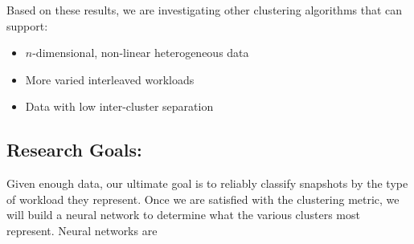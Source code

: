 
Based on these results,
we
are investigating other clustering algorithms that can support:

\begin{itemize}
\item $n$-dimensional, non-linear heterogeneous data
\item More varied interleaved workloads
\item Data with low inter-cluster separation
\end{itemize}


\subsection*{Research Goals: }
Given enough data, our ultimate goal is to reliably classify snapshots
by the type of workload they represent. Once we are satisfied with the clustering metric, we will build a neural network to determine what \mws the various clusters most represent. 
Neural networks are %

